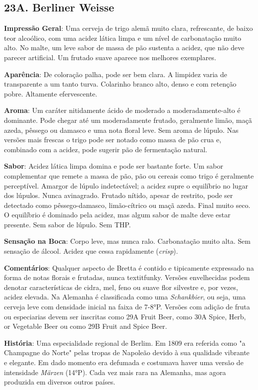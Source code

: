\subsection*{23A. Berliner Weisse}
\textbf{Impressão Geral}: Uma cerveja de trigo alemã muito clara, refrescante, de baixo teor alcoólico, com uma acidez lática limpa e um nível de carbonatação muito alto. No malte, um leve sabor de massa de pão sustenta a acidez, que não deve parecer artificial. Um frutado suave aparece nos melhores exemplares.

\textbf{Aparência}: De coloração palha, pode ser bem clara. A limpidez varia de transparente a um tanto turva. Colarinho branco alto, denso e com retenção pobre. Altamente efervescente.

\textbf{Aroma}: Um caráter nitidamente ácido de moderado a moderadamente-alto é dominante. Pode chegar até um moderadamente frutado, geralmente limão, maçã azeda, pêssego ou damasco e uma nota floral leve. Sem aroma de lúpulo. Nas versões mais frescas o trigo pode ser notado como massa de pão crua e, combinado com a acidez, pode sugerir pão de fermentação natural.

\textbf{Sabor}: Acidez lática limpa domina e pode ser bastante forte. Um sabor complementar que remete a massa de pão, pão ou cereais como trigo é geralmente perceptível. Amargor de lúpulo indetectável; a acidez supre o equilíbrio no lugar dos lúpulos. Nunca avinagrado. Frutado nítido, apesar de restrito, pode ser detectado como pêssego-damasco, limão-cítrico ou maçã azeda. Final muito seco. O equilíbrio é dominado pela acidez, mas algum sabor de malte deve estar presente. Sem sabor de lúpulo. Sem THP.

\textbf{Sensação na Boca}: Corpo leve, mas nunca ralo. Carbonatação muito alta. Sem sensação de álcool. Acidez que cessa rapidamente (\textit{crisp}).

\textbf{Comentários}: Qualquer aspecto de Bretta é contido e tipicamente expressado na forma de notas florais e frutadas, nunca textit{funky}. Versões envelhecidas podem denotar características de cidra, mel, feno ou suave flor silvestre e, por vezes, acidez elevada. Na Alemanha é classificada como uma \textit{Schankbier}, ou seja, uma cerveja leve com densidade inicial na faixa de 7-8°P. Versões com adição de fruta ou especiarias devem ser inscritas como 29A Fruit Beer, como 30A Spice, Herb, or Vegetable Beer ou como 29B Fruit and Spice Beer.

\textbf{História}: Uma especialidade regional de Berlim. Em 1809 era referida como "a Champagne do Norte" pelas tropas de Napoleão devido à sua qualidade vibrante e elegante. Em dado momento era defumada e costumava haver uma versão de intensidade \textit{Märzen} (14°P). Cada vez mais rara na Alemanha, mas agora produzida em diversos outros países.

